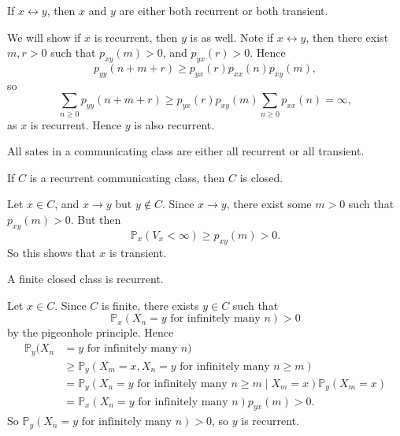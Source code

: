\documentclass[12pt]{article}
\begin{document}
\begin{theorem}
	If $x \leftrightarrow y$, then $x$ and $y$ are either both recurrent or both transient.
\end{theorem}

\begin{proofbox}
	We will show if $x$ is recurrent, then $y$ is as well. Note if $x \leftrightarrow y$, then there exist $m, r > 0$ such that $p_{xy}(m) > 0$, and $p_{yx}(r) > 0$. Hence
	\[
		p_{yy}(n + m + r) \geq p_{yx}(r)p_{xx}(n)p_{xy}(m),
	\]
	so
	\[
		\sum_{n \geq 0}p_{yy}(n+m+r) \geq p_{yx}(r)p_{xy}(m) \sum_{n \geq 0}p_{xx}(n) = \infty
	,\]
	as $x$ is recurrent. Hence $y$ is also recurrent.
\end{proofbox}

\begin{corollary}
	All sates in a communicating class are either all recurrent or all transient.
\end{corollary}

\begin{theorem}
	If $C$ is a recurrent communicating class, then $C$ is closed.
\end{theorem}

\begin{proofbox} Let $x \in C$, and $x \to y$ but $y \not \in C$. Since $x \to y$, there exist some $m > 0$ such that $p_{xy}(m) > 0$. But then
	\[
		\mathbb{P}_x(V_x < \infty) \geq p_{xy}(m) > 0
	.\]
	So this shows that $x$ is transient.
\end{proofbox}

\begin{theorem}
	A finite closed class is recurrent.
\end{theorem}

\begin{proofbox}
	Let $x \in C$. Since $C$ is finite, there exists $y \in C$ such that
	\[
		\mathbb{P}_x(X_n = y \text{ for infinitely many } n) > 0
	\]
	by the pigeonhole principle. Hence
	\begin{align*}
		\mathbb{P}_y(X_n &= y \text{ for infinitely many } n) \\
				 &\geq \mathbb{P}_y(X_m = x, X_n = y \text{ for infinitely many } n \geq m) \\
								     &= \mathbb{P}_y (X_n = y \text{ for infinitely many } n \geq m \mid X_m = x)\mathbb{P}_y(X_m = x) \\
								     &= \mathbb{P}_x(X_n = y \text{ for infinitely many } n) p_{yx}(m) > 0.
	\end{align*}
	So $\mathbb{P}_y(X_n = y \text{ for infinitely many } n) > 0$, so $y$ is recurrent.
\end{proofbox}
\end{document}
